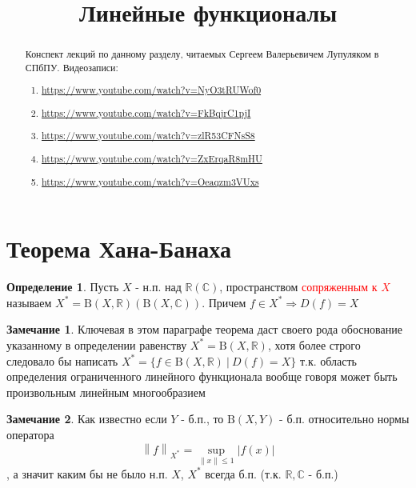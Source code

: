 \documentclass[12pt,a4paper]{article}
\title{Линейные функционалы}
\date{}
\theoremstyle{definition}
\newtheorem{definition}{Определение}[section]
\newtheorem{corollarydf}{Замечание}[definition]
\newcommand{\Real}{\mathbb{R}}
\newcommand{\Cmplx}{\mathbb{C}}
\newcommand{\norm}[1]{\left\lVert#1\right\rVert}
\newcommand{\setbuild}[2]{\{#1\:|\:#2\}}
\newcommand{\bounded}[2]{\textrm{B}(#1, #2)}
\begin{document}
\maketitle

\begin{abstract}
	Конспект лекций по данному разделу, читаемых Сергеем Валерьевичем Лупуляком в СПбПУ. Видеозаписи:
	\begin{enumerate}
		\item \url{https://www.youtube.com/watch?v=NyO3tRUWof0}
		\item \url{https://www.youtube.com/watch?v=FkBqjrC1pjI}
		\item \url{https://www.youtube.com/watch?v=zlR53CFNsS8}
		\item \url{https://www.youtube.com/watch?v=ZxErqaR8mHU}
		\item \url{https://www.youtube.com/watch?v=Oeaqzm3VUxs}
	\end{enumerate}
	
\end{abstract}

\newpage

\section{Теорема Хана-Банаха}

\begin{definition}
	Пусть $X$ - н.п. над $\Real(\Cmplx)$, пространством \textcolor{red}{сопряженным к $X$} называем $X^*=\bounded{X}{\Real}(\bounded{X}{\Cmplx})$. Причем $f\in X^*\Rightarrow D(f)=X$
\end{definition}
\begin{corollarydf}
	Ключевая в этом параграфе теорема даст своего рода обоснование указанному в определении равенству $X^*=\bounded{X}{\Real}$, хотя более строго следовало бы написать $X^*=\setbuild{f\in \bounded{X}{\Real}}{D(f)=X}$ т.к. область определения ограниченного линейного функционала вообще говоря может быть произвольным линейным многообразием
\end{corollarydf}
\begin{corollarydf}
	Как известно если $Y$ - б.п., то $\bounded{X}{Y}$ - б.п. относительно нормы оператора $$\norm{f}_{X^*}=\sup_{\norm{x}\leq1}|f(x)|$$, а значит каким бы не было н.п. $X$, $X^*$ всегда б.п. (т.к. $\Real,\Cmplx$ - б.п.)
\end{corollarydf}
\end{document}
